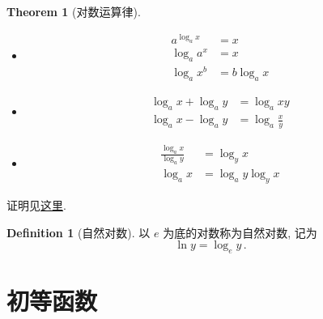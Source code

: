 \documentclass{book}
\newcommand{\e}{e}%
\numberwithin{equation}{section}
\numberwithin{figure}{section}
\theoremstyle{definition}
\newtheorem{definition}{Definition}
\newtheorem{theorem}{Theorem}[section]
\begin{document}
\begin{theorem}[对数运算律]
  \label{the:LogOperations}
  \leavevmode

  \begin{itemize}
    \item 
      \begin{align}
	a^{\log_a x} & =x\\
	\log_a a^x   & =x\\
	\log_a x^b   & =b\log_a x
      \end{align}
    \item 
      \begin{align}
	\log_a x+\log_a y & =\log_a xy\\
	\log_a x-\log_a y & =\log_a \frac{x}{y}
      \end{align}
    \item 
      \begin{align}
	\frac{\log_a x}{\log_a y} & =\log_y x\\
	\log_a x                  & =\log_a y\log_y x
      \end{align}
  \end{itemize}
\end{theorem}
证明见\hyperlink{proof:LogOperations}{这里}.

\begin{definition}[自然对数]
  以 $\e$ 为底的对数称为自然对数, 记为
  \begin{equation*}
    \ln y=\log_{\e} y\,.
  \end{equation*}
\end{definition}

\section{初等函数}
\end{document}
